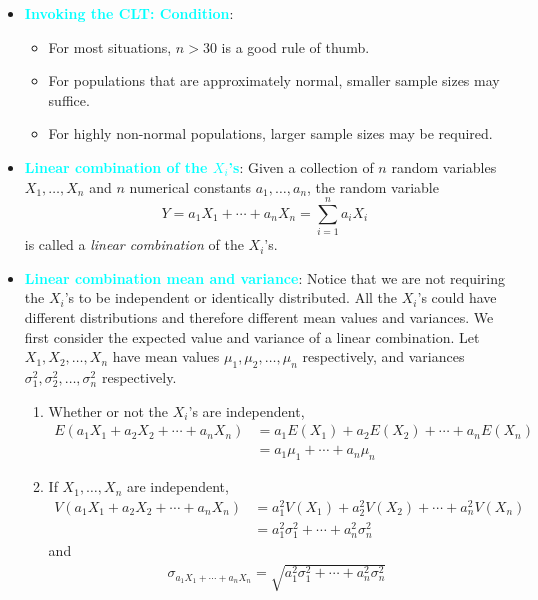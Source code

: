 \documentclass{report}
\begin{document}
\begin{itemize}
            \bigbreak \noindent 
        \item \textbf{\textcolor{cyan}{Invoking the CLT: Condition}}:
            \begin{itemize}
                \item For most situations, $n > 30$ is a good rule of thumb.
                \item For populations that are approximately normal, smaller sample sizes may suffice.
                \item For highly non-normal populations, larger sample sizes may be required.
            \end{itemize}
        \item \textbf{\textcolor{cyan}{Linear combination of the $X_{i}$'s}}:
            Given a collection of \(n\) random variables \(X_1, \ldots, X_n\) and \(n\) numerical constants \(a_1, \ldots, a_n\), the random variable
            \[
                Y = a_1 X_1 + \cdots + a_n X_n = \sum_{i=1}^{n} a_i X_i
            \]
            is called a \textit{linear combination} of the \(X_i\)'s.
        \item \textbf{\textcolor{cyan}{Linear combination mean and variance}}:
            Notice that we are not requiring the \( X_i \)'s to be independent or identically distributed. All the \( X_i \)'s could have different distributions and therefore different mean values and variances. We first consider the expected value and variance of a linear combination.
            \bigbreak \noindent 
            Let \( X_1, X_2, \ldots, X_n \) have mean values \( \mu_1, \mu_2, \ldots, \mu_n \) respectively, and variances \( \sigma_1^2, \sigma_2^2, \ldots, \sigma_n^2 \) respectively.
            \begin{enumerate}
                \item Whether or not the \( X_i \)'s are independent,
                    \begin{align}
                        E(a_1X_1 + a_2X_2 + \cdots + a_nX_n) &= a_1E(X_1) + a_2E(X_2) + \cdots + a_nE(X_n) \nonumber \\
                                                             &= a_1\mu_1 + \cdots + a_n\mu_n
                    \end{align}

                \item If \( X_1, \ldots, X_n \) are independent,
                    \begin{align}
                        V(a_1X_1 + a_2X_2 + \cdots + a_nX_n) &= a_1^2V(X_1) + a_2^2V(X_2) + \cdots + a_n^2V(X_n) \nonumber \\
                                                             &= a_1^2\sigma_1^2 + \cdots + a_n^2\sigma_n^2
                    \end{align}
                    and
                    \begin{align}
                        \sigma_{a_1X_1 + \cdots + a_nX_n} = \sqrt{a_1^2\sigma_1^2 + \cdots + a_n^2\sigma_n^2}
                    \end{align}


\end{enumerate}
\end{itemize}
\end{document}
